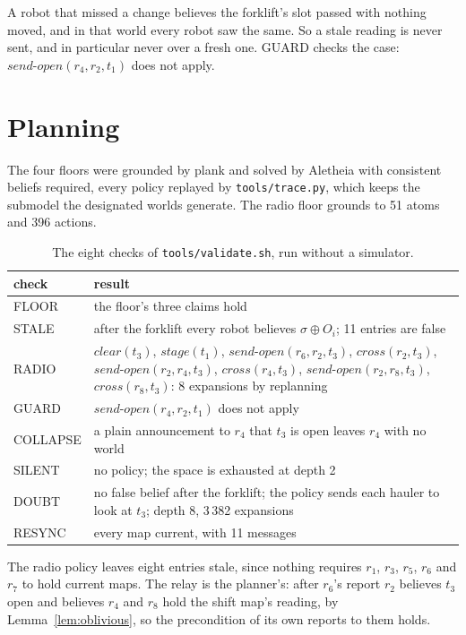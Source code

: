 \documentclass[11pt,a4paper]{article}
\theoremstyle{definition}
\newcommand{\code}[1]{\texttt{\small #1}}
\newcommand{\Obs}{O}
\newcommand{\shift}{\sigma}
\begin{document}
\noindent
A robot that missed a change believes the forklift's slot passed with nothing
moved, and in that world every robot saw the same. So a stale reading is never
sent, and in particular never over a fresh one. GUARD checks the case:
$\mathit{send\text{-}open}(r_4, r_2, t_1)$ does not apply.

\section{Planning}
\label{sec:planning}

The four floors were grounded by plank and solved by Aletheia with consistent
beliefs required, every policy replayed by \code{tools/trace.py}, which keeps the
submodel the designated worlds generate. The radio floor grounds to 51 atoms and
396 actions.

\begin{table}[H]
\centering\small
\begin{tabularx}{\textwidth}{@{}l X@{}}
\toprule
check & result \\
\midrule
FLOOR & the floor's three claims hold \\
STALE & after the forklift every robot believes $\shift \oplus \Obs_i$; 11 entries are false \\
RADIO & $\mathit{clear}(t_3)$, $\mathit{stage}(t_1)$, $\mathit{send\text{-}open}(r_6,r_2,t_3)$, $\mathit{cross}(r_2,t_3)$, $\mathit{send\text{-}open}(r_2,r_4,t_3)$, $\mathit{cross}(r_4,t_3)$, $\mathit{send\text{-}open}(r_2,r_8,t_3)$, $\mathit{cross}(r_8,t_3)$: 8 expansions by replanning \\
GUARD & $\mathit{send\text{-}open}(r_4, r_2, t_1)$ does not apply \\
COLLAPSE & a plain announcement to $r_4$ that $t_3$ is open leaves $r_4$ with no world \\
SILENT & no policy; the space is exhausted at depth 2 \\
DOUBT & no false belief after the forklift; the policy sends each hauler to look at $t_3$; depth 8, 3\,382 expansions \\
RESYNC & every map current, with 11 messages \\
\bottomrule
\end{tabularx}
\caption{The eight checks of \code{tools/validate.sh}, run without a simulator.}
\label{tab:checks}
\end{table}

The radio policy leaves eight entries stale, since nothing requires $r_1$, $r_3$,
$r_5$, $r_6$ and $r_7$ to hold current maps. The relay is the planner's: after
$r_6$'s report $r_2$ believes $t_3$ open and believes $r_4$ and $r_8$ hold the
shift map's reading, by Lemma~\ref{lem:oblivious}, so the precondition of its own
reports to them holds.
\end{document}
